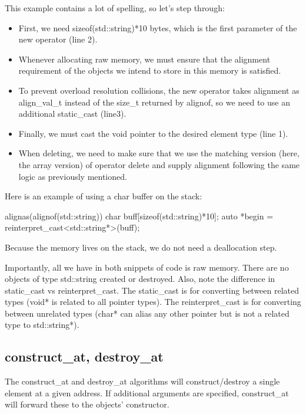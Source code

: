 This example contains a lot of spelling, so let’s step through:

\begin{itemize}
    \item First, we need sizeof(std::string)*10 bytes, which is the first parameter of the new operator (line 2).
    \item Whenever allocating raw memory, we must ensure that the alignment requirement of the objects we intend to store in this memory is satisfied.
    \item To prevent overload resolution collisions, the new operator takes alignment as align\_val\_t instead of the size\_t returned by alignof, so we need to use an additional static\_cast (line3).
    \item Finally, we must cast the void pointer to the desired element type (line 1).
    \item When deleting, we need to make sure that we use the matching version (here, the array version) of operator delete and supply alignment following the same logic as previously mentioned.
\end{itemize}

Here is an example of using a char buffer on the stack:

\begin{box-note}
\begin{cppcode}
alignas(alignof(std::string)) char buff[sizeof(std::string)*10];
auto *begin = reinterpret_cast<std::string*>(buff);
\end{cppcode}
\end{box-note}

Because the memory lives on the stack, we do not need a deallocation step.

Importantly, all we have in both snippets of code is raw memory. There are no objects of type std::string created or destroyed. Also, note the difference in static\_cast vs reinterpret\_cast. The static\_cast is for converting between related types (void* is related to all pointer types). The reinterpret\_cast is for converting between unrelated types (char* can alias any other pointer but is not a related type to std::string*).

\subsection{construct\_at, destroy\_at}

The construct\_at and destroy\_at algorithms will construct/destroy a single element at a given address. If additional arguments are specified, construct\_at will forward these to the objects’ constructor.

